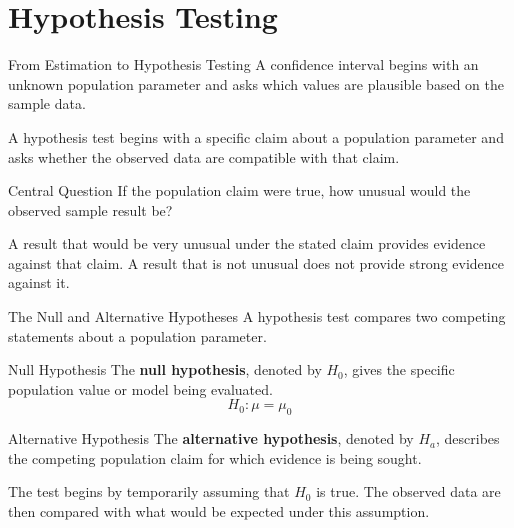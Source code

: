 \documentclass[aspectratio=169]{beamer}
\begin{document}
\section{Hypothesis Testing}

\begin{frame}{From Estimation to Hypothesis Testing}
A confidence interval begins with an unknown population parameter and asks which values are plausible based on the sample data.

\vspace{0.2cm}
A hypothesis test begins with a specific claim about a population parameter and asks whether the observed data are compatible with that claim.

\vspace{0.25cm}
\begin{block}{Central Question}
\centering
\large
If the population claim were true, how unusual would the observed sample result be?
\end{block}

\vspace{0.2cm}
A result that would be very unusual under the stated claim provides evidence against that claim. A result that is not unusual does not provide strong evidence against it.
\end{frame}

\begin{frame}{The Null and Alternative Hypotheses}
A hypothesis test compares two competing statements about a population parameter.

\vspace{0.10cm}
\begin{block}{Null Hypothesis}
The \textbf{null hypothesis}, denoted by $H_0$, gives the specific population value or model being evaluated.
$$H_0:\mu=\mu_0$$
\end{block}

\begin{block}{Alternative Hypothesis}
The \textbf{alternative hypothesis}, denoted by $H_a$, describes the competing population claim for which evidence is being sought.
\end{block}

\vspace{0.1cm}
The test begins by temporarily assuming that $H_0$ is true. The observed data are then compared with what would be expected under this assumption.
\end{frame}
\end{document}
